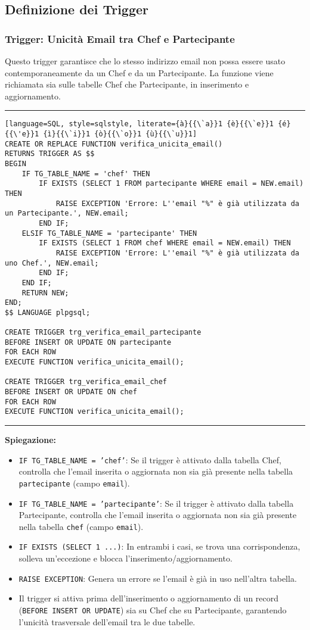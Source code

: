 \subsection{Definizione dei Trigger}

\subsubsection{Trigger: Unicità Email tra Chef e Partecipante}

Questo trigger garantisce che lo stesso indirizzo email non possa essere usato contemporaneamente da un Chef e da un Partecipante. La funzione viene richiamata sia sulle tabelle Chef che Partecipante, in inserimento e aggiornamento.

\noindent\rule{\textwidth}{0.4pt}
\begin{lstlisting}[language=SQL, style=sqlstyle, literate={à}{{\`a}}1 {è}{{\`e}}1 {é}{{\'e}}1 {ì}{{\`i}}1 {ò}{{\`o}}1 {ù}{{\`u}}1]
CREATE OR REPLACE FUNCTION verifica_unicita_email()
RETURNS TRIGGER AS $$
BEGIN
    IF TG_TABLE_NAME = 'chef' THEN
        IF EXISTS (SELECT 1 FROM partecipante WHERE email = NEW.email) THEN
            RAISE EXCEPTION 'Errore: L''email "%" è già utilizzata da un Partecipante.', NEW.email;
        END IF;
    ELSIF TG_TABLE_NAME = 'partecipante' THEN
        IF EXISTS (SELECT 1 FROM chef WHERE email = NEW.email) THEN
            RAISE EXCEPTION 'Errore: L''email "%" è già utilizzata da uno Chef.', NEW.email;
        END IF;
    END IF;
    RETURN NEW;
END;
$$ LANGUAGE plpgsql;

CREATE TRIGGER trg_verifica_email_partecipante
BEFORE INSERT OR UPDATE ON partecipante
FOR EACH ROW
EXECUTE FUNCTION verifica_unicita_email();

CREATE TRIGGER trg_verifica_email_chef
BEFORE INSERT OR UPDATE ON chef
FOR EACH ROW
EXECUTE FUNCTION verifica_unicita_email();
\end{lstlisting}
\noindent\rule{\textwidth}{0.4pt}

\textbf{Spiegazione:}
\begin{itemize}
    \item \texttt{IF TG\_TABLE\_NAME = 'chef'}: Se il trigger è attivato dalla tabella Chef, controlla che l'email inserita o aggiornata non sia già presente nella tabella \texttt{partecipante} (campo \texttt{email}).
    \item \texttt{IF TG\_TABLE\_NAME = 'partecipante'}: Se il trigger è attivato dalla tabella Partecipante, controlla che l'email inserita o aggiornata non sia già presente nella tabella \texttt{chef} (campo \texttt{email}).
    \item \texttt{IF EXISTS (SELECT 1 ...)}: In entrambi i casi, se trova una corrispondenza, solleva un'eccezione e blocca l'inserimento/aggiornamento.
    \item \texttt{RAISE EXCEPTION}: Genera un errore se l'email è già in uso nell'altra tabella.
    \item Il trigger si attiva prima dell'inserimento o aggiornamento di un record (\texttt{BEFORE INSERT OR UPDATE}) sia su Chef che su Partecipante, garantendo l'unicità trasversale dell'email tra le due tabelle.
\end{itemize}


